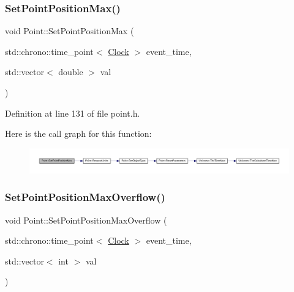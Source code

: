 \subsubsection{\texorpdfstring{Set\+Point\+Position\+Max()}{SetPointPositionMax()}}
{\footnotesize\ttfamily void Point\+::\+Set\+Point\+Position\+Max (\begin{DoxyParamCaption}\item[{std\+::chrono\+::time\+\_\+point$<$ \hyperlink{universe_8h_a0ef8d951d1ca5ab3cfaf7ab4c7a6fd80}{Clock} $>$}]{event\+\_\+time,  }\item[{std\+::vector$<$ double $>$}]{val }\end{DoxyParamCaption})\hspace{0.3cm}{\ttfamily [inline]}}



Definition at line 131 of file point.\+h.

Here is the call graph for this function\+:
\nopagebreak
\begin{figure}[H]
\begin{center}
\leavevmode
\includegraphics[width=350pt]{class_point_adb2897b1a7bde15e81b72cb59342f186_cgraph}
\end{center}
\end{figure}
\mbox{\label{class_point_a29aca71cae82195775f3822740df80ec}} 
\subsubsection{\texorpdfstring{Set\+Point\+Position\+Max\+Overflow()}{SetPointPositionMaxOverflow()}}
{\footnotesize\ttfamily void Point\+::\+Set\+Point\+Position\+Max\+Overflow (\begin{DoxyParamCaption}\item[{std\+::chrono\+::time\+\_\+point$<$ \hyperlink{universe_8h_a0ef8d951d1ca5ab3cfaf7ab4c7a6fd80}{Clock} $>$}]{event\+\_\+time,  }\item[{std\+::vector$<$ int $>$}]{val }\end{DoxyParamCaption})\hspace{0.3cm}{\ttfamily [inline]}}



